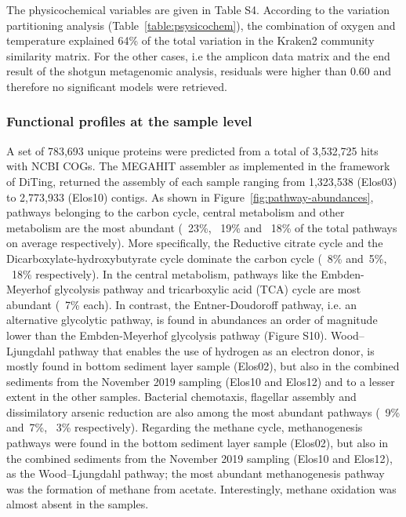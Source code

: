    The physicochemical variables are given in Table S4. 
   According to the variation partitioning analysis (Table~\ref{table:psysicochem}), the combination of oxygen and temperature explained 64\% of the total variation 
   in the Kraken2 community similarity matrix. 
   For the other cases, i.e the amplicon data matrix and the end result of the shotgun metagenomic analysis, residuals were higher than 0.60 and therefore no significant models were retrieved.


\subsubsection*{Functional profiles at the sample level}

   A set of 783,693 unique proteins were predicted from a total of 3,532,725 hits with NCBI COGs. 
   The MEGAHIT assembler as implemented in the framework of DiTing, returned the assembly of each sample 
   ranging from 1,323,538 (Elos03) to 2,773,933 (Elos10) contigs. 
   As shown in Figure~\ref{fig:pathway-abundances}, pathways belonging to the carbon cycle, central metabolism 
   and other metabolism are the most abundant (~23\%, ~19\% and ~18\% of the total pathways on average respectively). 
   More specifically, the Reductive citrate cycle and the Dicarboxylate-hydroxybutyrate cycle dominate the carbon cycle 
   (~8\% and~5\%, ~18\% respectively). 
   In the central metabolism, pathways like the Embden-Meyerhof glycolysis pathway and tricarboxylic acid (TCA) cycle 
   are most abundant (~7\% each). 
   In contrast, the Entner-Doudoroff pathway, i.e. an alternative glycolytic pathway, is found in abundances an order 
   of magnitude lower than the Embden-Meyerhof glycolysis pathway (Figure S10). 
   Wood–Ljungdahl pathway that enables the use of hydrogen as an electron donor, is mostly found in bottom sediment layer sample (Elos02), 
   but also in the combined sediments from the November 2019 sampling (Elos10 and Elos12) and to a lesser extent in the other samples. 
   Bacterial chemotaxis, flagellar assembly and dissimilatory arsenic reduction are also among the most abundant pathways (~9\% and~7\%, ~3\% respectively). 
   Regarding the methane cycle, methanogenesis pathways were found in the bottom sediment layer sample (Elos02), but also in the combined sediments 
   from the November 2019 sampling (Elos10 and Elos12), as the Wood–Ljungdahl pathway; 
   the most abundant methanogenesis pathway was the formation of methane from acetate. 
   Interestingly, methane oxidation was almost absent in the samples. 
